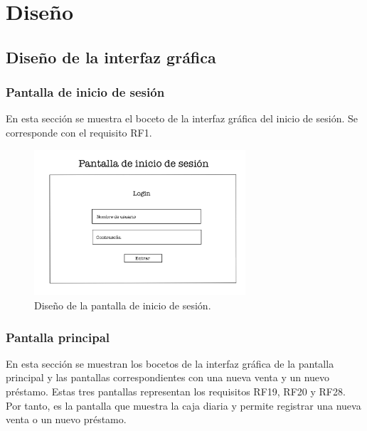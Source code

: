 \chapter{Diseño}
\label{chap:design}

\section{Diseño de la interfaz gráfica}

\subsection{Pantalla de inicio de sesión}

En esta sección se muestra el boceto de la interfaz gráfica del inicio de sesión. Se corresponde con el requisito RF1. 

\begin{figure}[ht]
	\centering
	\includegraphics[width=0.7\textwidth, angle=270]{imagenes/inicio_sesion.JPG}
	\caption{Diseño de la pantalla de inicio de sesión.}
	\label{fig:iniciosesion}
\end{figure}


\subsection{Pantalla principal}

En esta sección se muestran los bocetos de la interfaz gráfica de la pantalla principal y las pantallas correspondientes con una nueva venta y un nuevo préstamo. Estas tres pantallas representan los requisitos RF19, RF20 y RF28. Por tanto, es la pantalla que muestra la caja diaria y permite registrar una nueva venta o un nuevo préstamo. 

